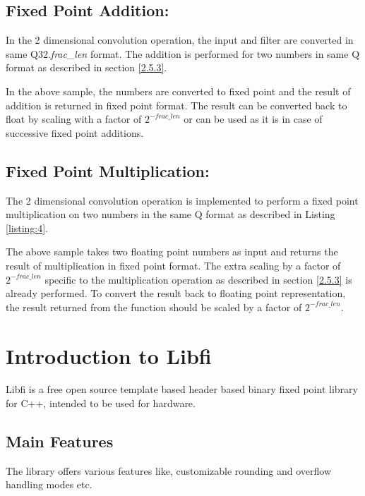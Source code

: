 \subsection{Fixed Point Addition:}

\vspace{0.25cm}
\noindent In the 2 dimensional convolution operation, the input and filter are converted in same Q32.\textit{frac\_len} format. The addition is performed for two numbers in same Q format as described in section \ref{2.5.3}.


\noindent In the above sample, the numbers are converted to fixed point and the result of addition is returned in fixed point format. The result can be converted back to float by scaling with a factor of $2^{-frac\_len}$ or can be used as it is in case of successive fixed point additions.

\vspace{0.25cm}
\subsection{Fixed Point Multiplication:}

\vspace{0.25cm}
\noindent The 2 dimensional convolution operation is implemented to perform a fixed point multiplication on two numbers in the same Q format as described in Listing \ref{listing:4}.
\noindent 


\noindent The above sample takes two floating point numbers as input and returns the result of multiplication in fixed point format. The extra scaling by a factor of $2^{-frac\_len}$ specific to the multiplication operation as described in section \ref{2.5.3} is already performed. To convert the result back to floating point representation, the result returned from the function should be scaled by a factor of $2^{-frac\_len}$.
\section{Introduction to Libfi}
Libfi is a free open source template based header based binary fixed point library for C++, intended to be used for hardware.
\subsection{Main Features}
The library offers various features like, customizable rounding and overflow handling modes etc.
